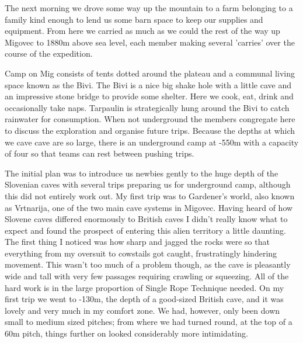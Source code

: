 The next morning we drove some way up the mountain to a farm belonging to a
family kind enough to lend us some barn space to keep our supplies and
equipment. From here we carried as much as we could the rest of the way up
Migovec to 1880m above sea level, each member making several 'carries' over the
course of the expedition.

Camp on Mig consists of tents dotted around the plateau and a communal living
space known as the Bivi. The Bivi is a nice big shake hole with a little cave
and an impressive stone bridge to provide some shelter. Here we cook, eat,
drink and occasionally take naps. Tarpaulin is strategically hung around the
Bivi to catch rainwater for consumption. When not underground the members
congregate here to discuss the exploration and organise future trips. Because
the depths at which we cave cave are so large, there is an underground camp at
-550m with a capacity of four so that teams can rest between pushing trips.

The initial plan was to introduce us newbies gently to the huge depth of the
Slovenian caves with several trips preparing us for underground camp, although
this did not entirely work out. My first trip was to Gardener's world, also
known as Vrtnarija, one of the two main cave systems in Migovec. Having heard
of how Slovene caves differed enormously to British caves I didn't really know
what to expect and found the prospect of entering this alien territory a little
daunting. The first thing I noticed was how sharp and jagged the rocks were so
that everything from my oversuit to cowstails got caught, frustratingly
hindering movement. This wasn't too much of a problem though, as the cave is
pleasantly wide and tall with very few passages requiring crawling or
squeezing. All of the hard work is in the large proportion of Single Rope
Technique needed. On my first trip we went to -130m, the depth of a good-sized
British cave, and it was lovely and very much in my comfort zone. We had,
however, only been down small to medium sized pitches; from where we had turned
round, at the top of a 60m pitch, things further on looked considerably more
intimidating.

